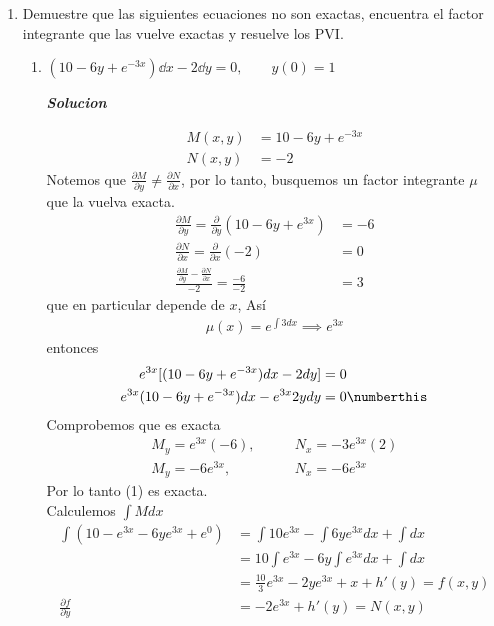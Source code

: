 \begin{enumerate}
    \item Demuestre que las siguientes ecuaciones no son exactas, encuentra el factor integrante que las vuelve exactas y resuelve los PVI.
\begin{enumerate}
    \item $(10-6y+e^{-3x})\dd x- 2 \dd y=0, \qquad y(0)=1$
    
\textit{ \textbf{Solucion}}
    
    \begin{align*}
        M(x,y) &= 10-6y+e^{-3x}\\
        N(x,y) &=-2
\end{align*}
Notemos que $\displaystyle \frac{\partial M}{\partial y} \neq \frac{\partial N}{\partial x}$, por lo tanto, busquemos un factor integrante $\mu$ que la vuelva exacta.
\begin{align*}
    \frac{\partial M}{\partial y} = \frac{\partial}{\partial y}(10-6y+e^{3x})&=-6\\
    \frac{\partial N}{\partial x} = \frac{\partial}{\partial x} (-2)&=0\\
    \frac{\frac{\partial M}{\partial y} - \frac{\partial N}{\partial x}}{-2} = \frac{-6}{-2} &= 3
\end{align*}
que en particular depende de $x$, Así
\begin{align*}
    \mu(x)= e^{\int 3dx}\implies e^{3x}
\end{align*}
entonces
\begin{align*}
    e^{3x}[(10-6y+e^{-3x})dx-2dy]&=0\\
    e^{3x}(10-6y+e^{-3x})dx-e^{3x}2ydy & = 0 \numberthis
\end{align*}
Comprobemos que es exacta
\begin{align*}
    M_{y}=e^{3x}(-6), \qquad & N_{x}= -3e^{3x}(2)\\
    M_{y}=-6e^{3x}, \qquad & N_{x}= -6e^{3x}
\end{align*}
Por lo tanto (1) es exacta.\\
Calculemos $\displaystyle \int M dx$
\allowdisplaybreaks
\begin{align*}
    \int (10-e^{3x}-6ye^{3x}+e^{0}) &=\int 10e^{3x}-\int 6ye^{3x}dx+\int dx\\
    & = 10 \int e^{3x} - 6y\int e^{3x}dx+\int dx\\
    & = \frac{10}{3}e^{3x}-2ye^{3x}+x+h'(y) = f(x,y)\\
    \frac{\partial f}{\partial y} & = - 2e^{3x} + h'(y) = N(x,y)\\

\end{align*}
\end{enumerate}
\end{enumerate}
